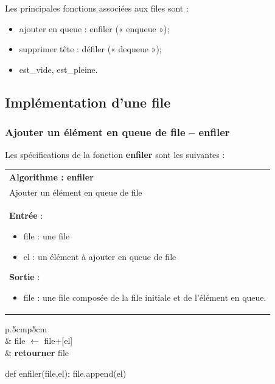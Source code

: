 \documentclass[10pt,fleqn]{article} %
\begin{document}
\begin{rem}
Les principales fonctions associées aux files sont : 
\begin{itemize}
\item ajouter en queue : enfiler (« enqueue »);
\item supprimer tête : défiler (« dequeue »);
\item est\_vide, est\_pleine.
\end{itemize}
\end{rem}


\subsection{Implémentation d'une file}

\subsubsection{Ajouter un élément en queue de file -- \textbf{enfiler}}
Les spécifications de la fonction \textbf{enfiler} sont les suivantes :

\begin{tabular}{p{\linewidth}}
\hline
\textbf{Algorithme : enfiler} \\
Ajouter un élément en queue de file \\
\hline
\textbf{Entrée} : 
\begin{itemize}
\item file : une file
\item el : un élément à ajouter en queue de file
\end{itemize}
\textbf{Sortie} : 
\begin{itemize}
\item file  : une file composée de la file initiale et de l'élément en queue.
\end{itemize} \\
\hline 
\end{tabular}

\vspace{.5cm}

\noindent \begin{minipage}[c]{.48\linewidth}
\begin{pseudo}
\begin{tabular}{p{.5cm}p{5cm}}
\hline
{}  \\
& file $\leftarrow$ file+[el] \\
& \textbf{retourner} file \\
\hline
\end{tabular}
\end{pseudo}
\end{minipage}\hfill
\begin{minipage}[c]{.48\linewidth}
\begin{py}
\begin{python}
def enfiler(file,el):
    file.append(el)
\end{python}
\end{py}
\end{minipage}
\end{document}
